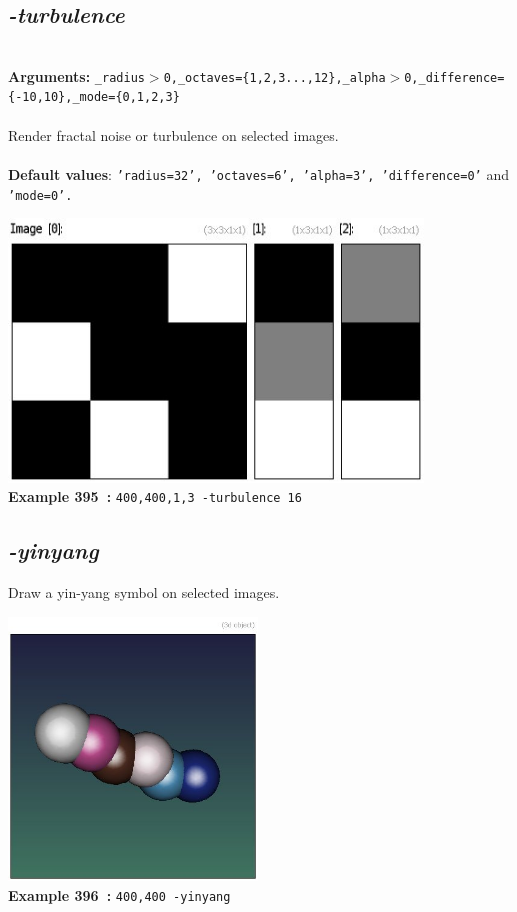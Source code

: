 \documentclass[a4paper,11pt,twoside]{book}
\begin{document}
\subsection{\emph{-turbulence} }\vspace*{-0.5em}
~\\\textbf{Arguments: } 
{\small \texttt{\_radius$>$0,\_octaves=\{1,2,3...,12\},\_alpha$>$0,\_difference=\{-10,10\},\_mode=\{0,1,2,3\}}}\\~\\
Render fractal noise or turbulence on selected images.
~\\~\\\textbf{Default values}: {\small \texttt{'radius=32', 'octaves=6', 'alpha=3', 'difference=0'} and \texttt{'mode=0'.}}
\begin{center}\includegraphics[keepaspectratio=true,height=7cm,width=\textwidth]{img/gmic_def395.jpg}\\
{\footnotesize \textbf{Example 395~:} \texttt{400,400,1,3 -turbulence 16}}
\end{center}

\subsection{\emph{-yinyang} }\vspace*{-0.5em}
Draw a yin-yang symbol on selected images.
\begin{center}\includegraphics[keepaspectratio=true,height=7cm,width=\textwidth]{img/gmic_def396.jpg}\\
{\footnotesize \textbf{Example 396~:} \texttt{400,400 -yinyang}}
\end{center}
\end{document}
